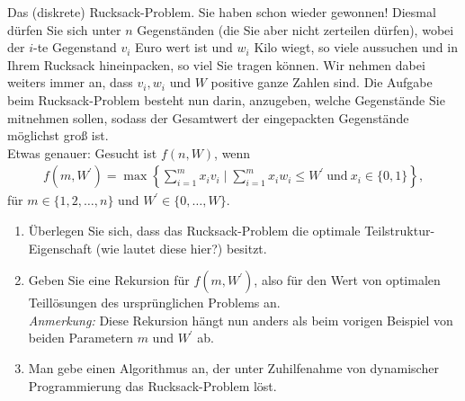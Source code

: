 
\begin{exercise}

Das (diskrete) Rucksack-Problem. Sie haben schon wieder gewonnen! Diesmal dürfen
Sie sich unter $n$ Gegenständen (die Sie aber nicht zerteilen dürfen), wobei der
$i$-te Gegenstand $v_i$ Euro wert ist und $w_i$ Kilo wiegt, so viele aussuchen und
in Ihrem Rucksack hineinpacken, so viel Sie tragen können. Wir nehmen dabei weiters
immer an, dass $v_i,w_i$ und $W$ positive ganze Zahlen sind. Die Aufgabe beim
\glqq Rucksack-Problem \grqq besteht nun darin, anzugeben, welche Gegenstände
Sie mitnehmen sollen, sodass der Gesamtwert der eingepackten Gegenstände möglichst groß ist. \\
Etwas genauer: Gesucht ist $f(n,W)$, wenn
\begin{align*}
  f(m, W^{\prime}) = \max\left\{\sum_{i=1}^m x_iv_i \mid \sum_{i=1}^m x_iw_i \leq
  W^{\prime}~ \text{und}~ x_i \in \{0,1\}\right\},
\end{align*}
für $m \in \{1,2,\dots,n\}$ und $W^{\prime} \in \{0,\dots,W\}$.
\begin{enumerate}[label = \alph*)]
  \item Überlegen Sie sich, dass das Rucksack-Problem die optimale Teilstruktur-Eigenschaft
  (wie lautet diese hier?) besitzt.
  \item Geben Sie eine Rekursion für $f(m,W^{\prime})$, also für den Wert von
  optimalen Teillösungen des ursprünglichen Problems an. \\
  \textit{Anmerkung:} Diese Rekursion hängt nun anders als beim vorigen Beispiel von beiden Parametern $m$ und $W^{\prime}$
  ab.
  \item Man gebe einen Algorithmus an, der unter Zuhilfenahme von dynamischer Programmierung
  das Rucksack-Problem löst.
\end{enumerate}
\end{exercise}



